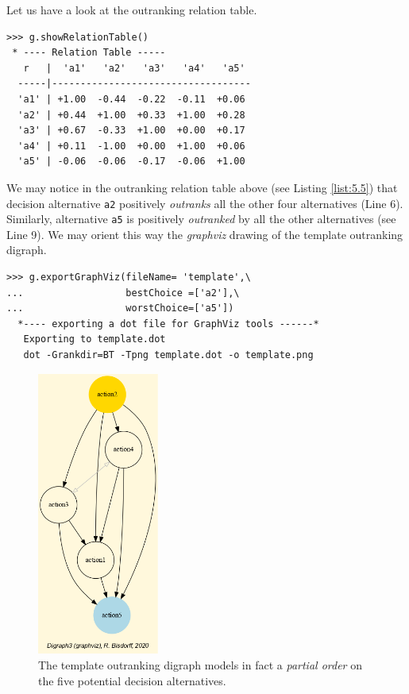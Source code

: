 Let us have a look at the outranking relation table.
\begin{lstlisting}[caption={The template outranking relation},label=list:5.5]
>>> g.showRelationTable()
 * ---- Relation Table -----
   r   |  'a1'   'a2'   'a3'   'a4'   'a5'   
  -----|-----------------------------------
  'a1' | +1.00  -0.44  -0.22  -0.11  +0.06  
  'a2' | +0.44  +1.00  +0.33  +1.00  +0.28  
  'a3' | +0.67  -0.33  +1.00  +0.00  +0.17  
  'a4' | +0.11  -1.00  +0.00  +1.00  +0.06  
  'a5' | -0.06  -0.06  -0.17  -0.06  +1.00
\end{lstlisting}
We may notice in the outranking relation table above (see Listing \ref{list:5.5}) that decision alternative \texttt{a2} positively \emph{outranks} all the other four alternatives  (Line 6). Similarly, alternative \texttt{a5} is positively \emph{outranked} by all the other alternatives (see Line 9). We may orient this way the \emph{graphviz} drawing of the template outranking digraph. 
\begin{lstlisting}
>>> g.exportGraphViz(fileName= 'template',\
...                  bestChoice =['a2'],\
...                  worstChoice=['a5'])
  *---- exporting a dot file for GraphViz tools ------*
   Exporting to template.dot
   dot -Grankdir=BT -Tpng template.dot -o template.png
\end{lstlisting}
\begin{figure}[h]
\sidecaption[t]
\includegraphics[width=4cm]{Figures/template.png}
\caption{The template outranking digraph models in fact a \emph{partial order} on the five potential decision alternatives.}
\label{fig:5.1}       %
\end{figure}

